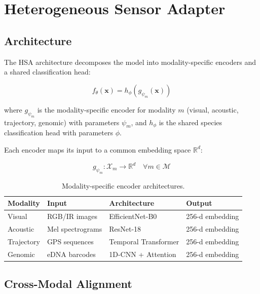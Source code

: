 \documentclass[11pt,a4paper]{article}
\begin{document}
\section{Heterogeneous Sensor Adapter}
\label{sec:hsa}

\subsection{Architecture}

The HSA architecture decomposes the model into modality-specific encoders and a shared classification head:

\begin{equation}
    f_\theta(\mathbf{x}) = h_\phi(g_{\psi_m}(\mathbf{x}))
\end{equation}

\noindent where $g_{\psi_m}$ is the modality-specific encoder for modality $m$ (visual, acoustic, trajectory, genomic) with parameters $\psi_m$, and $h_\phi$ is the shared species classification head with parameters $\phi$.

Each encoder maps its input to a common embedding space $\mathbb{R}^d$:

\begin{equation}
    g_{\psi_m}: \mathcal{X}_m \rightarrow \mathbb{R}^d \quad \forall m \in \mathcal{M}
\end{equation}

\begin{table}[H]
\centering
\caption{Modality-specific encoder architectures.}
\label{tab:encoders}
\begin{tabularx}{\textwidth}{@{}lllX@{}}
\toprule
\textbf{Modality} & \textbf{Input} & \textbf{Architecture} & \textbf{Output} \\
\midrule
Visual & RGB/IR images & EfficientNet-B0 & 256-d embedding \\
Acoustic & Mel spectrograms & ResNet-18 & 256-d embedding \\
Trajectory & GPS sequences & Temporal Transformer & 256-d embedding \\
Genomic & eDNA barcodes & 1D-CNN + Attention & 256-d embedding \\
\bottomrule
\end{tabularx}
\end{table}

\subsection{Cross-Modal Alignment}
\end{document}
